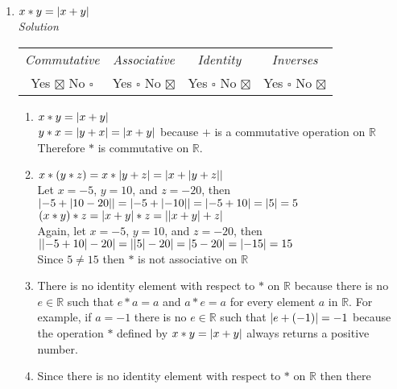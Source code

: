 \documentclass[12pt]{article}
\DeclarePairedDelimiter{\abs}{\lvert}{\rvert}
\begin{document}
\begin{flushleft}
\begin{enumerate}
          \item $x * y = \abs{ x + y }$ \\
            \medskip
            \textit{Solution}
            \medskip
              \begin{tabular}{c c c c}
                \textit{Commutative} & \textit{Associative} & \textit{Identity} & \textit{Inverses} \\
                Yes $\boxtimes$ No $\square$ & Yes $\square$ No $\boxtimes$ & Yes $\square$ No $\boxtimes$ & Yes $\square$ No $\boxtimes$  \\
              \end{tabular}
              \begin{enumerate} 
                \item $x * y = \abs{x + y}$ \\
                  $y * x = \abs{y + x} = \abs{x + y}$  because $+$ is a commutative operation on $\mathbb{R}$ \\
                  Therefore $*$ is commutative on $\mathbb{R}$.
                \item 
                  $x * (y * z) = x * \abs{y + z} = \abs{x + \abs{y + z}}$ \\
                  Let $x = -5$, $ y = 10$, and $z = -20$, then \\
                  $\abs{-5 + \abs{10-20}} = \abs{-5 + \abs{-10}} = \abs{-5 + 10} = \abs{5} = 5$ \\
                  $(x * y) * z = \abs{x + y} * z = \abs{\abs{x + y} + z}$ \\
                  Again, let $x = -5$, $ y = 10$, and $z = -20$, then \\
                  $\abs{\abs{-5 + 10}-20} = \abs{\abs{5}-20} = \abs{5-20} = \abs{-15} = 15$ \\
                  Since $5 \neq 15$ then $*$ is not associative on $\mathbb{R}$
                \item There is no identity element with respect to $*$ on $\mathbb{R}$ because there 
                  is no $e \in \mathbb{R}$ such that $e * a = a$ and $a * e = a$ for every element 
                  $a$ in $\mathbb{R}$. For example, if $a = -1$ there is no $e \in \mathbb{R}$ such 
                  that $\abs{e + (-1)} = -1$ because the operation $*$ defined by $x * y = \abs{ x + y }$ 
                  always returns a positive number.  
                \item Since there is no identity element with respect to $*$ on $\mathbb{R}$ then there 

\end{enumerate}
\end{enumerate}
\end{flushleft}
\end{document}
